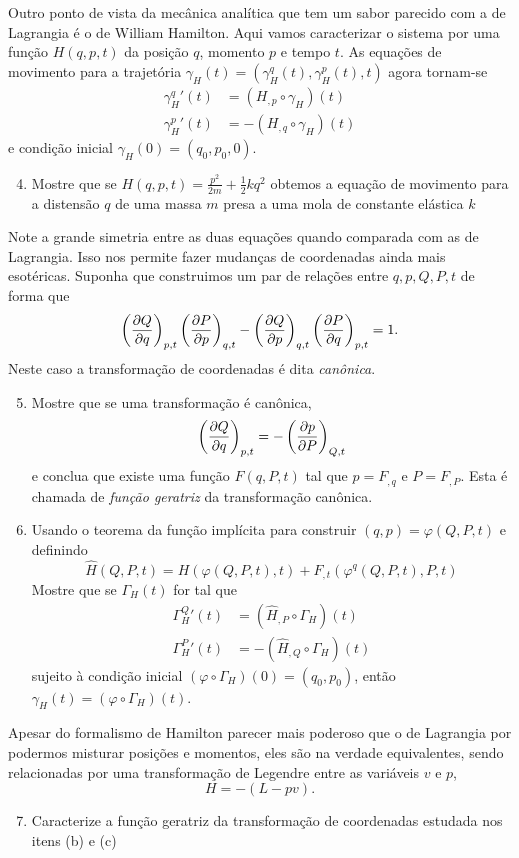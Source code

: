 \documentclass[a4paper, 12pt]{article}
\makeatletter
\newcommand\problemanswers{}
\newcommand{\answer}[1]{\listxadd{\problemanswers}{\thesection.\theenumi\ifnum\@enumdepth=2\theenumii\fi) \unexpanded{#1}}}
\newcommand{\pd}[3]{\ifblank{#3}{}{\left(}\frac{\partial #1}{\partial #2}\ifblank{#3}{}{\right)_{#3}}}
\theoremstyle{definition}
\theoremstyle{definition}
\makeatother
\begin{document}
\begin{enumerate}
    Outro ponto de vista da mecânica analítica que tem um sabor parecido com a de Lagrangia é o de 
    William Hamilton. Aqui vamos caracterizar o sistema por uma função $H(q,p,t)$ da posição
    $q$, momento $p$ e tempo $t$. As equações de movimento para a trajetória 
    $\gamma_H(t)=(\gamma_H^q(t),\gamma_H^p(t),t)$
    agora tornam-se
    \begin{align*}
        \gamma_H^q{'}(t)&=(H_{,p}\circ\gamma_H)(t)\\
        \gamma_H^p{'}(t)&=-(H_{,q}\circ\gamma_H)(t)
    \end{align*}
    e condição inicial $\gamma_H(0)=(q_0,p_0,0)$.
    \begin{enumerate}
        \setcounter{enumii}{3}
        \item Mostre que se $H(q,p,t)=\frac{p^2}{2m}+\frac{1}{2}kq^2$ obtemos a equação de movimento
        para a distensão $q$ de uma massa $m$ presa a uma mola de constante elástica $k$
    \end{enumerate}
    Note a grande simetria entre as duas equações quando comparada com as de Lagrangia. Isso nos permite
    fazer mudanças de coordenadas ainda mais esotéricas. Suponha que construimos um par de relações entre
    $q,p,Q,P,t$ de forma que
    $$\pd{Q}{q}{p,t}\pd{P}{p}{q,t}-\pd{Q}{p}{q,t}\pd{P}{q}{p,t}=1.$$
    Neste caso a transformação de coordenadas é dita \textit{canônica}.
    \begin{enumerate}
        \setcounter{enumii}{4}
        \item Mostre que se uma transformação é canônica,
        $$\pd{Q}{q}{p,t}=-\pd{p}{P}{Q,t}$$
        e conclua que existe uma função $F(q,P,t)$ tal que $p=F_{,q}$ e $P=F_{,P}$. Esta é chamada de 
        \textit{função geratriz} da transformação canônica.
        \item Usando o teorema da função implícita para construir $(q,p)=\varphi(Q,P,t)$ e definindo
        $$\hat H(Q,P,t)=H(\varphi(Q,P,t),t)+F_{,t}(\varphi^q(Q,P,t),P,t)$$
        Mostre que se $\Gamma_H(t)$ for tal que
        \begin{align*}
            \Gamma_H^Q{'}(t)&=(\hat H_{,P}\circ\Gamma_H)(t)\\
            \Gamma_H^P{'}(t)&=-(\hat H_{,Q}\circ\Gamma_H)(t)
        \end{align*}
        sujeito à condição inicial $(\varphi\circ\Gamma_H)(0)=(q_0,p_0)$, então $\gamma_H(t)=(\varphi\circ\Gamma_H)(t)$.
    \end{enumerate}
    Apesar do formalismo de Hamilton parecer mais poderoso que o de Lagrangia por podermos misturar 
    posições e momentos, eles são na verdade equivalentes, sendo relacionadas por uma transformação
    de Legendre entre as variáveis $v$ e $p$,
    $$H=-(L-pv).$$
    \begin{enumerate}
        \setcounter{enumii}{6}
        \item Caracterize a função geratriz da transformação de coordenadas estudada nos itens (b) e (c)
        \answer{$F(q,P,t)=P\varphi(q,t),\quad f(q,\varphi(q,t),t)=0$}
    \end{enumerate}
\end{enumerate}
\end{document}
